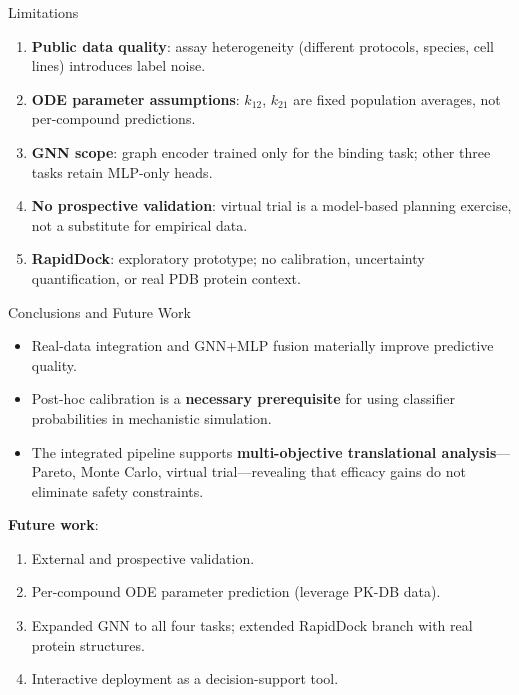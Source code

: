 \documentclass{beamer}
\begin{document}
\begin{frame}{Limitations}
\begin{enumerate}
    \item \textbf{Public data quality}: assay heterogeneity (different protocols, species, cell lines) introduces label noise.
    \item \textbf{ODE parameter assumptions}: $k_{12}$, $k_{21}$ are fixed population averages, not per-compound predictions.
    \item \textbf{GNN scope}: graph encoder trained only for the binding task; other three tasks retain MLP-only heads.
    \item \textbf{No prospective validation}: virtual trial is a model-based planning exercise, not a substitute for empirical data.
    \item \textbf{RapidDock}: exploratory prototype; no calibration, uncertainty quantification, or real PDB protein context.
\end{enumerate}
\end{frame}

\begin{frame}{Conclusions and Future Work}
\begin{itemize}
    \item Real-data integration and GNN+MLP fusion materially improve predictive quality.
    \item Post-hoc calibration is a \textbf{necessary prerequisite} for using classifier probabilities in mechanistic simulation.
    \item The integrated pipeline supports \textbf{multi-objective translational analysis}---Pareto, Monte Carlo, virtual trial---revealing that efficacy gains do not eliminate safety constraints.
\end{itemize}
\vspace{0.2cm}
\textbf{Future work}:
\begin{enumerate}
    \item External and prospective validation.
    \item Per-compound ODE parameter prediction (leverage PK-DB data).
    \item Expanded GNN to all four tasks; extended RapidDock branch with real protein structures.
    \item Interactive deployment as a decision-support tool.
\end{enumerate}
\end{frame}

\end{document}
